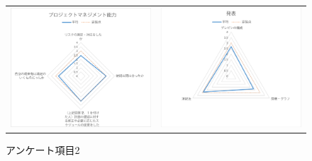 \documentclass[uplatex]{jsarticle}
\begin{document}
\begin{center}
  \begin{figure}[H]
    \begin{tabular}{cc}
      \begin{minipage}[t]{0.45\hsize}
        \centering
        \includegraphics[keepaspectratio, scale=0.4]{g1.pdf}
        \caption{アンケート項目1}
        \label{ラベル1}
      \end{minipage} &
      \begin{minipage}[t]{0.60\hsize}
        \centering
        \includegraphics[keepaspectratio, scale=0.4]{g2.pdf}
        \caption{アンケート項目2}
        \label{ラベル2}
      \end{minipage}
    \end{tabular}
  \end{figure}
\end{center}



\end{document}
